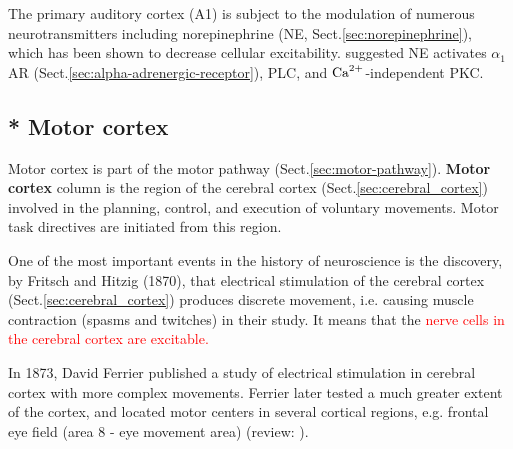 The primary auditory cortex (A1) is subject to the modulation of numerous
neurotransmitters including norepinephrine (NE, Sect.\ref{sec:norepinephrine}),
which has been shown to decrease cellular excitability. \citep{dinh2009}
suggested NE activates $\alpha_1$ AR (Sect.\ref{sec:alpha-adrenergic-receptor}),
PLC, and ${\text{Ca}^{2+}}$-independent PKC.



\subsection{* Motor cortex}
\label{sec:motor-cortex}


Motor cortex is part of the motor pathway (Sect.\ref{sec:motor-pathway}).
{\bf Motor cortex} column is the region of the cerebral cortex
(Sect.\ref{sec:cerebral_cortex}) involved in the planning, control, and
execution of voluntary movements. 
Motor task directives are initiated from this region.

\begin{mdframed}
One of the most important events in the history of neuroscience is the
discovery, by Fritsch and Hitzig (1870), that electrical stimulation of the
cerebral cortex (Sect.\ref{sec:cerebral_cortex}) produces discrete movement,
i.e. causing muscle contraction (spasms and twitches) in their study. It means
that the \textcolor{red}{nerve cells in the cerebral cortex are excitable.} 

In 1873, David Ferrier published a study of electrical stimulation in
cerebral cortex with more complex movements.
Ferrier later tested a much greater extent of the cortex, and located motor
centers in several cortical regions, e.g.
frontal eye field (area 8 - eye movement area) (review: \citep{taylor2003}).

\end{mdframed}


